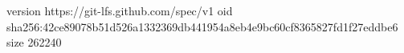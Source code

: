 version https://git-lfs.github.com/spec/v1
oid sha256:42ce89078b51d526a1332369db441954a8eb4e9bc60cf8365827fd1f27eddbe6
size 262240
